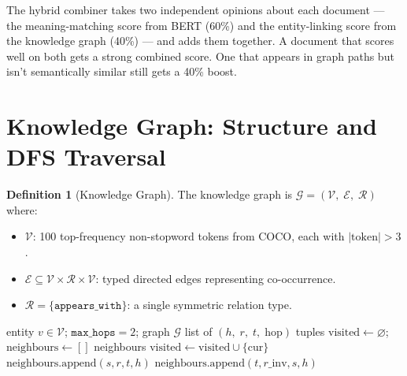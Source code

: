 \documentclass[12pt,a4paper]{article}
\theoremstyle{definition}
\newtheorem{definition}{Definition}[section]
\theoremstyle{plain}
\theoremstyle{remark}
\begin{document}
\begin{tcolorbox}[laymanbox]
The hybrid combiner takes two independent opinions about each document
--- the meaning-matching score from BERT (60\%) and the entity-linking
score from the knowledge graph (40\%) --- and adds them together. A
document that scores well on both gets a strong combined score. One
that appears in graph paths but isn't semantically similar still gets
a 40\% boost.
\end{tcolorbox}

\newpage
\section{Knowledge Graph: Structure and DFS Traversal}

\begin{definition}[Knowledge Graph]
\label{def:kg}
The knowledge graph is $\mathcal{G} = (\mathcal{V},\; \mathcal{E},\;
\mathcal{R})$ where:
\begin{itemize}
  \item $\mathcal{V}$: 100 top-frequency non-stopword tokens from COCO,
        each with $|\text{token}| > 3$.
  \item $\mathcal{E} \subseteq \mathcal{V} \times \mathcal{R} \times \mathcal{V}$:
        typed directed edges representing co-occurrence.
  \item $\mathcal{R} = \{\texttt{appears\_with}\}$: a single
        symmetric relation type.
\end{itemize}
\end{definition}

\begin{algorithm}[H]
\caption{$\mathcal{G}.\textsc{GetNeighbours}(v,\; \texttt{max\_hops})$
--- Depth-First Search}
\label{alg:dfs}
\begin{algorithmic}[1]
\Require entity $v \in \mathcal{V}$; $\texttt{max\_hops}=2$; graph $\mathcal{G}$
\Ensure list of $(h,\; r,\; t,\; \text{hop})$ tuples
\State $\text{visited} \gets \varnothing$;\quad
       $\text{neighbours} \gets []$
\State {}
\State \Return neighbours
    \Return
  \EndIf
  \State $\text{visited} \gets \text{visited} \cup \{\text{cur}\}$
      \State $\text{neighbours}.\text{append}(s, r, t, h)$
      \State {}
      \State $\text{neighbours}.\text{append}(t, r\_\text{inv}, s, h)$
      \State {}
    \EndIf
  \EndFor
\EndProcedure
\end{algorithmic}
\end{algorithm}
\end{document}

